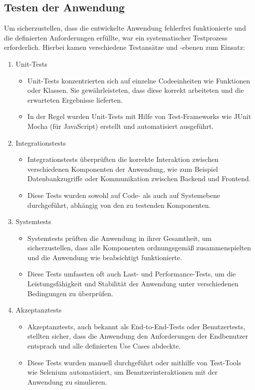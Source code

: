 \begin{flushleft}
		\subsection{Testen der Anwendung}
			Um sicherzustellen, dass die entwickelte Anwendung fehlerfrei funktionierte und die definierten Anforderungen erfüllte, war ein systematischer Testprozess erforderlich. Hierbei kamen verschiedene Testansätze und -ebenen zum Einsatz:

		\begin{enumerate}
		\item Unit-Tests
				\begin{itemize}
					\item Unit-Tests konzentrierten sich auf einzelne Codeeinheiten wie Funktionen oder Klassen. Sie gewährleisteten, dass diese korrekt arbeiteten und die erwarteten Ergebnisse lieferten.
					\item In der Regel wurden Unit-Tests mit Hilfe von Test-Frameworks wie JUnit Mocha (für JavaScript) erstellt und automatisiert ausgeführt.
				\end{itemize}

			\item Integrationstests
				\begin{itemize}
					\item Integrationstests überprüften die korrekte Interaktion zwischen verschiedenen Komponenten der Anwendung, wie zum Beispiel Datenbankzugriffe oder Kommunikation zwischen Backend und Frontend.
					\item Diese Tests wurden sowohl auf Code- als auch auf Systemebene durchgeführt, abhängig von den zu testenden Komponenten.
				\end{itemize}

			\item Systemtests
				\begin{itemize}
					\item Systemtests prüften die Anwendung in ihrer Gesamtheit, um sicherzustellen, dass alle Komponenten ordnungsgemäß zusammenspielten und die Anwendung wie beabsichtigt funktionierte.
					\item Diese Tests umfassten oft auch Last- und Performance-Tests, um die Leistungsfähigkeit und Stabilität der Anwendung unter verschiedenen Bedingungen zu überprüfen.
				\end{itemize}

			\item Akzeptanztests
				\begin{itemize}
					\item Akzeptanztests, auch bekannt als End-to-End-Tests oder Benutzertests, stellten sicher, dass die Anwendung den Anforderungen der Endbenutzer entsprach und alle definierten Use Cases abdeckte.
					\item Diese Tests wurden manuell durchgeführt oder mithilfe von Test-Tools wie Selenium automatisiert, um Benutzerinteraktionen mit der Anwendung zu simulieren.
				\end{itemize}
		\end{enumerate}


\end{flushleft}
